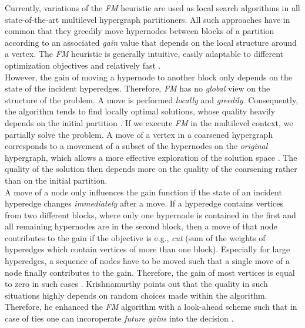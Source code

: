 Currently, variations of the \emph{FM} heuristic \cite{fiduccia1988linear} are used 
as local search algorithms in all state-of-the-art multilevel hypergraph partitioners.  
All such approaches have in common that they greedily move hypernodes 
between blocks of a partition according to an associated \emph{gain} value that 
depends on the local structure around a vertex. The \emph{FM} heuristic is generally
intuitive, easily adaptable to different optimization objectives and
relatively fast \cite{zhao2002effective}. \\
However, the gain of moving a hypernode to another block only depends on the state of the
incident hyperedges. Therefore, \emph{FM} has no \emph{global} view on the structure
of the problem. A move is performed \emph{locally} and \emph{greedily}.
Consequently, the algorithm tends to find locally optimal solutions, whose quality heavily depends
on the initial partition \cite{dutt1997vlsi}. 
If we execute \emph{FM} in the multilevel context, we partially solve the problem.
A move of a vertex in a coarsened hypergraph corresponds to a movement
of a subset of the hypernodes on the \emph{original} hypergraph, which allows a more 
effective exploration of the solution space \cite{papa2007hypergraph}. The quality of
the solution then depends more on the quality of the coarsening rather than
on the initial partition.\\
A move of a node only influences the gain function if the state of an incident hyperedge
changes \emph{immediately} after a move. If a hyperedge contains vertices from two different blocks,
where only one hypernode is contained in the first and all remaining hypernodes are in the second block,
then a move of that node contributes to the gain if the objective is e.g., \emph{cut} 
(sum of the weights of hyperedges which contain vertices of more than one block). 
Especially for large hyperedges, a sequence of nodes have to be moved
such that a single move of a node finally contributes to the gain.
Therefore, the gain of most vertices is equal to zero in such cases \cite{mann2014formula}. 
Krishnamurthy \cite{krishnamurthy1984improved} points out that the quality 
in such situations highly depends on random choices made within
the algorithm. Therefore, he enhanced the \emph{FM} algorithm with a look-ahead scheme
such that in case of ties one can incoroperate \emph{future gains} into the decision \cite{krishnamurthy1984improved}.
